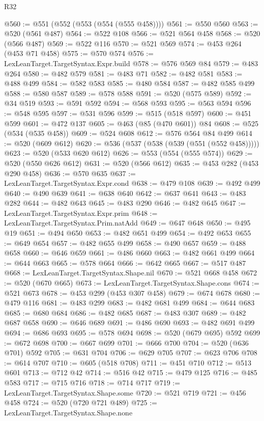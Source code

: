 \begin{lexlean}{R32}
\begin{coremodule}
{{{{{{{{{{{{{{{{{{{{{{{{{{{{{{{{{{{{{{{{{{{{{{{{{{{@560 := @551 (@552 (@553 (@554 (@555 @458))))
@561 := @550 @560
@563 := @520 (@561 @487)
@564 := @522 @108
@566 := @521 @564 @458
@568 := @520 (@566 @487)
@569 := @522 @116
@570 := @521 @569
@574 := @453 @264 (@453 @71 @458)
@575 := @570 @574
@576 := LexLeanTarget.TargetSyntax.Expr.build
@578 := @576 @569 @84
@579 := @483 @264
@580 := @482 @579
@581 := @483 @71
@582 := @482 @581
@583 := @488 @499
@584 := @582 @583
@585 := @480 @584
@587 := @482 @585 @499
@588 := @580 @587
@589 := @578 @588
@591 := @520 (@575 @589)
@592 := @34 @519
@593 := @591 @592
@594 := @568 @593
@595 := @563 @594
@596 := @548 @595
@597 := @531 @596
@599 := @515 (@518 @597)
@600 := @451 @599
@601 := @472 @137
@605 := @463 (@85 (@470 @601)) @84
@608 := @525 (@534 (@535 @458))
@609 := @524 @608
@612 := @576 @564 @84 @499
@614 := @520 (@609 @612)
@620 := @536 (@537 (@538 (@539 (@551 (@552 @458)))))
@623 := @520 (@533 @620 @612)
@626 := @553 (@554 (@555 @574))
@629 := @520 (@550 @626 @612)
@631 := @520 (@566 @612)
@635 := @453 @282 (@453 @290 @458)
@636 := @570 @635
@637 := LexLeanTarget.TargetSyntax.Expr.cond
@638 := @479 @108
@639 := @492 @499
@640 := @490 @639
@641 := @638 @640
@642 := @637 @641
@643 := @483 @282
@644 := @482 @643
@645 := @483 @290
@646 := @482 @645
@647 := LexLeanTarget.TargetSyntax.Expr.prim
@648 := LexLeanTarget.TargetSyntax.Prim.natAdd
@649 := @647 @648
@650 := @495 @19
@651 := @494 @650
@653 := @482 @651 @499
@654 := @492 @653
@655 := @649 @654
@657 := @482 @655 @499
@658 := @490 @657
@659 := @488 @658
@660 := @646 @659
@661 := @486 @660
@663 := @482 @661 @499
@664 := @644 @663
@665 := @578 @664
@666 := @642 @665
@667 := @517 @487
@668 := LexLeanTarget.TargetSyntax.Shape.nil
@670 := @521 @668 @458
@672 := @520 (@670 @665)
@673 := LexLeanTarget.TargetSyntax.Shape.cons
@674 := @521 @673
@678 := @453 @299 (@453 @307 @458)
@679 := @674 @678
@680 := @479 @116
@681 := @483 @299
@683 := @482 @681 @499
@684 := @644 @683
@685 := @680 @684
@686 := @482 @685
@687 := @483 @307
@689 := @482 @687 @658
@690 := @646 @689
@691 := @486 @690
@693 := @482 @691 @499
@694 := @686 @693
@695 := @578 @694
@698 := @520 (@679 @695) @592
@699 := @672 @698
@700 := @667 @699
@701 := @666 @700
@704 := @520 (@636 @701) @592
@705 := @631 @704
@706 := @629 @705
@707 := @623 @706
@708 := @614 @707
@710 := @605 (@518 @708)
@711 := @451 @710
@712 := @513 @601
@713 := @712 @42
@714 := @516 @42
@715 := @479 @125
@716 := @485 @583
@717 := @715 @716
@718 := @714 @717
@719 := LexLeanTarget.TargetSyntax.Shape.some
@720 := @521 @719
@721 := @456 @458
@724 := @520 (@720 @721 @489)
@725 := LexLeanTarget.TargetSyntax.Shape.none
}}}}}}}}}}}}}}}}}}}}}}}}}}}}}}}}}}}}}}}}}}}}}}}}}}}
\end{coremodule}
\end{lexlean}
